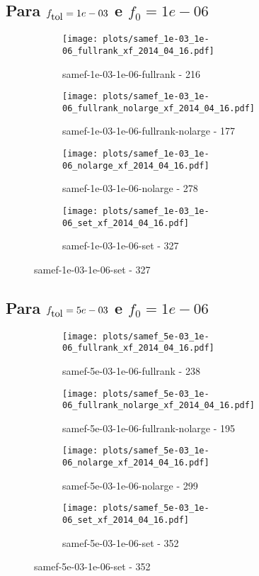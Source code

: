 \newpage
\subsection{Para $f_{\mbox{tol}} = 1e-03$ e $f_0 = 1e-06$}

\begin{figure}[H]
  \centering
  \begin{subfigure}{0.48\textwidth}
    \texttt{[image: plots/samef\_1e-03\_1e-06\_fullrank\_xf\_2014\_04\_16.pdf]}
    \caption{samef-1e-03-1e-06-fullrank - 216}
  \end{subfigure}
  \begin{subfigure}{0.48\textwidth}
    \texttt{[image: plots/samef\_1e-03\_1e-06\_fullrank\_nolarge\_xf\_2014\_04\_16.pdf]}
    \caption{samef-1e-03-1e-06-fullrank-nolarge - 177}
  \end{subfigure}
  \begin{subfigure}{0.48\textwidth}
    \texttt{[image: plots/samef\_1e-03\_1e-06\_nolarge\_xf\_2014\_04\_16.pdf]}
    \caption{samef-1e-03-1e-06-nolarge - 278}
  \end{subfigure}
  \begin{subfigure}{0.48\textwidth}
    \texttt{[image: plots/samef\_1e-03\_1e-06\_set\_xf\_2014\_04\_16.pdf]}
    \caption{samef-1e-03-1e-06-set - 327}
  \end{subfigure}
\end{figure}

\newpage
\subsection{Para $f_{\mbox{tol}} = 5e-03$ e $f_0 = 1e-06$}

\begin{figure}[H]
  \centering
  \begin{subfigure}{0.48\textwidth}
    \texttt{[image: plots/samef\_5e-03\_1e-06\_fullrank\_xf\_2014\_04\_16.pdf]}
    \caption{samef-5e-03-1e-06-fullrank - 238}
  \end{subfigure}
  \begin{subfigure}{0.48\textwidth}
    \texttt{[image: plots/samef\_5e-03\_1e-06\_fullrank\_nolarge\_xf\_2014\_04\_16.pdf]}
    \caption{samef-5e-03-1e-06-fullrank-nolarge - 195}
  \end{subfigure}
  \begin{subfigure}{0.48\textwidth}
    \texttt{[image: plots/samef\_5e-03\_1e-06\_nolarge\_xf\_2014\_04\_16.pdf]}
    \caption{samef-5e-03-1e-06-nolarge - 299}
  \end{subfigure}
  \begin{subfigure}{0.48\textwidth}
    \texttt{[image: plots/samef\_5e-03\_1e-06\_set\_xf\_2014\_04\_16.pdf]}
    \caption{samef-5e-03-1e-06-set - 352}
  \end{subfigure}
\end{figure}

